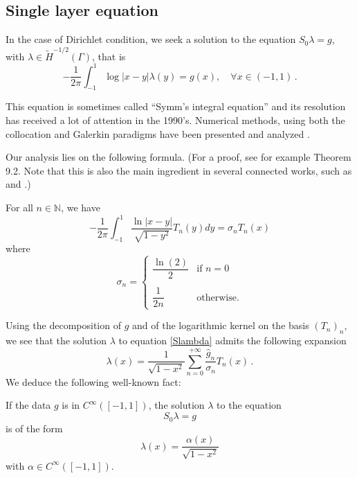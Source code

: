 \documentclass[a4paper]{subfiles}
\begin{document}
\subsection{Single layer equation}

In the case of Dirichlet condition, we seek a solution to the equation $S_0\lambda = g$, with $\lambda \in \tilde{H}^{-1/2}(\Gamma)$, that is
\begin{equation}
-\frac{1}{2\pi}\int_{-1}^{1} \log|x-y| \lambda(y) = g(x), \quad \forall x\in (-1,1)\,.\label{Slambda}
\end{equation} 

This equation is sometimes called ``Symm's integral equation'' and its resolution has received a lot of attention in the 1990's. Numerical methods, using both the collocation and Galerkin paradigms have been presented and analyzed \cite{atkinson1991numerical,yan1988integral,yan1990cosine,sloan1992collocation,yan1989mesh}. 


Our analysis lies on the following formula. (For a proof, see for example \cite{mason2002chebyshev} Theorem 9.2. Note that this is also the main ingredient in several connected works, such as  \cite{bruno2012second} and \cite{jiang2004second}.)

\begin{lemma}
For all $n\in \mathbb{N}$, we have
	\[-\frac{1}{2\pi}\int_{-1}^{1} \frac{\ln|x-y|}{\sqrt{1 - y^2}}T_n(y)dy = \sigma_n T_n(x)\]
	where
	\[\sigma_n = \begin{cases}
	\dfrac{\ln(2)}{2} & \text{if } n=0\\
	\\
	\dfrac{1}{2n} & \text{otherwise}.
	\end{cases}\]
	\label{STn}
\end{lemma}

Using the decomposition of $g$ and of the logarithmic kernel on the basis $(T_n)_n$, we see that the solution $\lambda$ to equation \eqref{Slambda} admits the following expansion 
\begin{equation}
\lambda(x) = \frac{1}{\sqrt{1-x^2}}\sum_{n=0}^{+ \infty} \frac{\hat{g}_n}{\sigma_n} T_n(x)\,.
\label{expansionLambda}
\end{equation}
We deduce the following well-known fact:
\begin{corollary}
	\label{CorSingularity}
	If the data $g$ is in $C^{\infty}([-1,1])$, the solution $\lambda$ to the equation 
	\[S_0\lambda = g\]
	is of the form 
	\[\lambda(x) = \dfrac{\alpha(x)}{\sqrt{1-x^2}}\]
	with $\alpha \in C^{\infty}([-1,1])$.  
\end{corollary}
\end{document}
